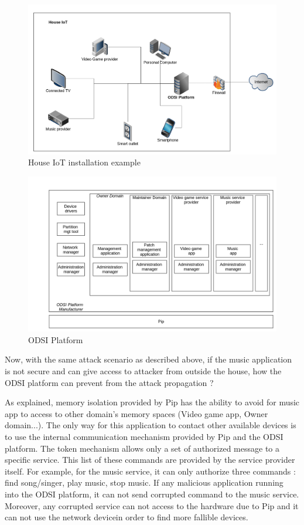 \documentclass[conference]{IEEEtran}
\begin{document}
\begin{figure}[!t]
	\centering
	\includegraphics[width=1\linewidth]{figures/HouseIOT}
	\caption[House IoT installation example]{House IoT installation example}
	\label{fig:houseiot}
\end{figure}
\begin{figure}[t!]
	\centering
	\includegraphics[width=1\linewidth]{figures/ODSIplatform}
	\caption{ODSI Platform}
	\label{fig:odsiplatform}
\end{figure}


Now, with the same attack scenario as described above, if the music application is not secure and can give access to attacker from outside the house, how the ODSI platform 
can prevent from the attack propagation ? 

As explained, memory isolation provided by Pip has the ability to avoid for music app to access to other domain's memory spaces (Video game app, Owner domain...). The only way for this application to contact other available devices is to use the internal communication mechanism provided by Pip and the ODSI platform. The token mechanism allows only a set of authorized message to a specific service. This list of these commands are provided by the service provider itself. For example, for the music service, it can only authorize three commands : find song/singer, play music, stop music. If any malicious application running into the ODSI platform, it can not send corrupted command to the music service. Moreover, any corrupted service can not access to the hardware due to Pip and it can not use the network devicein order to find more fallible devices. 
\end{document}
